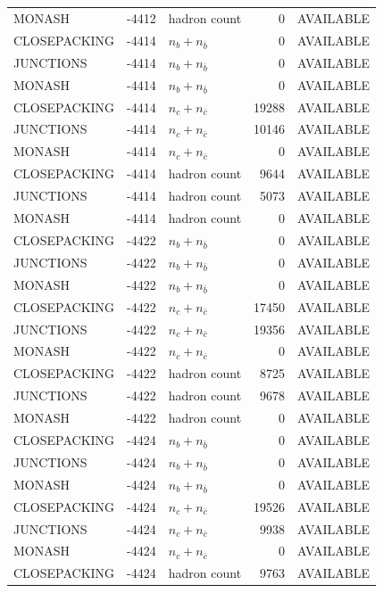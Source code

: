 \begin{landscape}
\begin{longtable}{@{}lrlrl@{}}
MONASH & -4412 & hadron count & \num{0} & AVAILABLE \\
CLOSEPACKING & -4414 & $n_b+n_{\bar b}$ & \num{0} & AVAILABLE \\
JUNCTIONS & -4414 & $n_b+n_{\bar b}$ & \num{0} & AVAILABLE \\
MONASH & -4414 & $n_b+n_{\bar b}$ & \num{0} & AVAILABLE \\
CLOSEPACKING & -4414 & $n_c+n_{\bar c}$ & \num{19288} & AVAILABLE \\
JUNCTIONS & -4414 & $n_c+n_{\bar c}$ & \num{10146} & AVAILABLE \\
MONASH & -4414 & $n_c+n_{\bar c}$ & \num{0} & AVAILABLE \\
CLOSEPACKING & -4414 & hadron count & \num{9644} & AVAILABLE \\
JUNCTIONS & -4414 & hadron count & \num{5073} & AVAILABLE \\
MONASH & -4414 & hadron count & \num{0} & AVAILABLE \\
CLOSEPACKING & -4422 & $n_b+n_{\bar b}$ & \num{0} & AVAILABLE \\
JUNCTIONS & -4422 & $n_b+n_{\bar b}$ & \num{0} & AVAILABLE \\
MONASH & -4422 & $n_b+n_{\bar b}$ & \num{0} & AVAILABLE \\
CLOSEPACKING & -4422 & $n_c+n_{\bar c}$ & \num{17450} & AVAILABLE \\
JUNCTIONS & -4422 & $n_c+n_{\bar c}$ & \num{19356} & AVAILABLE \\
MONASH & -4422 & $n_c+n_{\bar c}$ & \num{0} & AVAILABLE \\
CLOSEPACKING & -4422 & hadron count & \num{8725} & AVAILABLE \\
JUNCTIONS & -4422 & hadron count & \num{9678} & AVAILABLE \\
MONASH & -4422 & hadron count & \num{0} & AVAILABLE \\
CLOSEPACKING & -4424 & $n_b+n_{\bar b}$ & \num{0} & AVAILABLE \\
JUNCTIONS & -4424 & $n_b+n_{\bar b}$ & \num{0} & AVAILABLE \\
MONASH & -4424 & $n_b+n_{\bar b}$ & \num{0} & AVAILABLE \\
CLOSEPACKING & -4424 & $n_c+n_{\bar c}$ & \num{19526} & AVAILABLE \\
JUNCTIONS & -4424 & $n_c+n_{\bar c}$ & \num{9938} & AVAILABLE \\
MONASH & -4424 & $n_c+n_{\bar c}$ & \num{0} & AVAILABLE \\
CLOSEPACKING & -4424 & hadron count & \num{9763} & AVAILABLE \\

\end{longtable}
\end{landscape}
